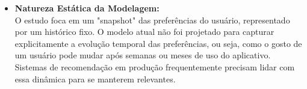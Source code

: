\begin{itemize}
    \item \textbf{Natureza Estática da Modelagem:}
    \\ O estudo foca em um "snapshot" das preferências do usuário, representado por um histórico fixo. O modelo atual não foi projetado para capturar explicitamente a evolução temporal das preferências, ou seja, como o gosto de um usuário pode mudar após semanas ou meses de uso do aplicativo. Sistemas de recomendação em produção frequentemente precisam lidar com essa dinâmica para se manterem relevantes.
\end{itemize}